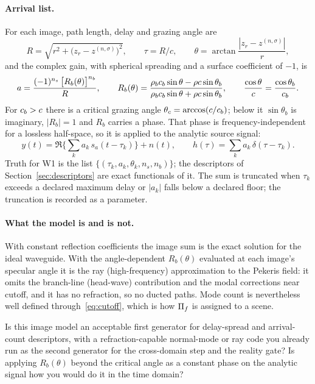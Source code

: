 \paragraph{Arrival list.} For each image, path length, delay and grazing angle are
\begin{equation}
  R = \sqrt{r^2+\big(z_r-z^{(n,\sigma)}\big)^2},\qquad \tau=R/c,\qquad
  \theta=\arctan\frac{|z_r-z^{(n,\sigma)}|}{r},
\end{equation}
and the complex gain, with spherical spreading and a surface coefficient of $-1$, is
\begin{equation}
  a = \frac{(-1)^{n_s}\,\big[R_b(\theta)\big]^{n_b}}{R},
  \qquad
  R_b(\theta) = \frac{\rho_{b}c_{b}\sin\theta-\rho c\sin\theta_b}{\rho_{b}c_{b}\sin\theta+\rho c\sin\theta_b},
  \qquad \frac{\cos\theta}{c}=\frac{\cos\theta_b}{c_{b}}.
  \label{eq:rayleigh}
\end{equation}
For $c_{b}>c$ there is a critical grazing angle $\theta_c=\arccos(c/c_{b})$; below it $\sin\theta_b$ is imaginary, $|R_b|=1$ and $R_b$ carries a phase. That phase is frequency-independent for a lossless half-space, so it is applied to the analytic source signal:
\begin{equation}
  y(t) = \Re\Big\{\sum_k a_k\, s_a(t-\tau_k)\Big\} + n(t),
  \qquad
  h(\tau)=\sum_k a_k\,\delta(\tau-\tau_k).
  \label{eq:received}
\end{equation}
Truth for W1 is the list $\{(\tau_k,a_k,\theta_k,n_s,n_b)\}$; the descriptors of Section~\ref{sec:descriptors} are exact functionals of it. The sum is truncated when $\tau_k$ exceeds a declared maximum delay or $|a_k|$ falls below a declared floor; the truncation is recorded as a parameter.

\paragraph{What the model is and is not.} With constant reflection coefficients the image sum is the exact solution for the ideal waveguide. With the angle-dependent $R_b(\theta)$ evaluated at each image's specular angle it is the ray (high-frequency) approximation to the Pekeris field: it omits the branch-line (head-wave) contribution and the modal corrections near cutoff, and it has no refraction, so no ducted paths. Mode count is nevertheless well defined through~\eqref{eq:cutoff}, which is how $\Pi_{f}$ is assigned to a scene.

\begin{question}
Is this image model an acceptable first generator for delay-spread and arrival-count descriptors, with a refraction-capable normal-mode or ray code you already run as the second generator for the cross-domain step and the reality gate? Is applying $R_b(\theta)$ beyond the critical angle as a constant phase on the analytic signal how you would do it in the time domain?
\end{question}

